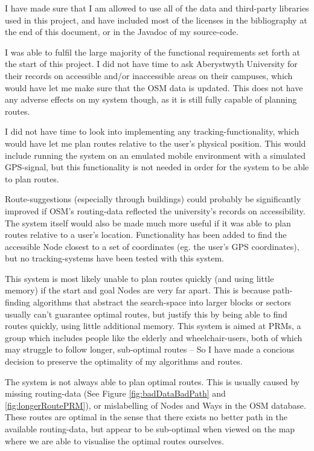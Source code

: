I have made sure that I am allowed to use all of the data and third-party libraries used in this project, and have included most of the licenses in the bibliography at the end of this document, or in the Javadoc of my source-code.

I was able to fulfil the large majority of the functional requirements set forth at the start of this project. I did not have time to ask Aberystwyth University for their records on accessible and/or inaccessible areas on their campuses, which would have let me make sure that the OSM data is updated. This does not have any adverse effects on my system though, as it is still fully capable of planning routes.

I did not have time to look into implementing any tracking-functionality, which would have let me plan routes relative to the user's physical position. This would include running the system on an emulated mobile environment with a simulated GPS-signal, but this functionality is not needed in order for the system to be able to plan routes.

Route-suggestions (especially through buildings) could probably be significantly improved if OSM's routing-data reflected the university's records on accessibility. The system itself would also be made much more useful if it was able to plan routes relative to a user's location. Functionality has been added to find the accessible Node closest to a set of coordinates (eg. the user's GPS coordinates), but no tracking-systems have been tested with this system.

This system is most likely unable to plan routes quickly (and using little memory) if the start and goal Nodes are very far apart. This is because path-finding algorithms that abstract the search-space into larger blocks or sectors usually can't guarantee optimal routes, but justify this by being able to find routes quickly, using little additional memory. This system is aimed at PRMs, a group which includes people like the elderly and wheelchair-users, both of which may struggle to follow longer, sub-optimal routes -- So I have made a concious decision to preserve the optimality of my algorithms and routes.

The system is not always able to plan optimal routes. This is usually caused by missing routing-data (See Figure \ref{fig:badDataBadPath} and \ref{fig:longerRoutePRM}), or mislabelling of Nodes and Ways in the OSM database. These routes are optimal in the sense that there exists no better path in the available routing-data, but appear to be sub-optimal when viewed on the map where we are able to visualise the optimal routes ourselves.

